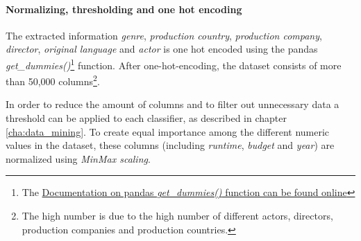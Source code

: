\paragraph{Normalizing, thresholding and one hot encoding}
The extracted information \textit{genre},\textit{ production country}, \textit{production company}, \textit{director}, \textit{original language} and \textit{actor} is one hot encoded using the pandas \textit{get\_dummies()}\footnote{The \hyperref{https://pandas.pydata.org/pandas-docs/stable/generated/pandas.get_dummies.html}{documentation}{pd.getDumies}{Documentation on pandas \textit{get\_dummies()} function can be found online}} function. After one-hot-encoding, the dataset consists of more than 50,000 columns\footnote{The high number is due to the high number of different actors, directors, production companies and production countries.}.

In order to reduce the amount of columns and to filter out unnecessary data a threshold can be applied to each classifier, as described in chapter \ref{cha:data_mining}. To create equal importance among the different numeric values in the dataset, these columns (including \textit{runtime}, \textit{budget} and \textit{year}) are normalized using \textit{MinMax scaling}.





